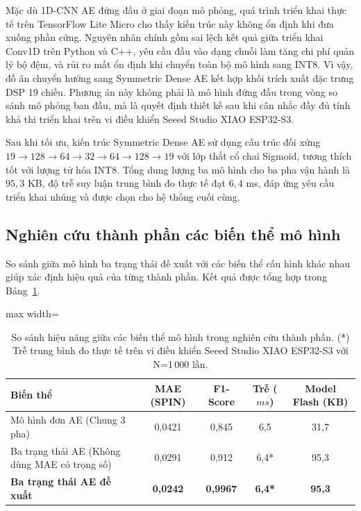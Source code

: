 Mặc dù 1D-CNN AE đứng đầu ở giai đoạn mô phỏng, quá trình triển khai thực tế trên TensorFlow Lite Micro cho thấy kiến trúc này không ổn định khi đưa xuống phần cứng. Nguyên nhân chính gồm sai lệch kết quả giữa triển khai Conv1D trên Python và C++, yêu cầu đầu vào dạng chuỗi làm tăng chi phí quản lý bộ đệm, và rủi ro mất ổn định khi chuyển toàn bộ mô hình sang INT8. Vì vậy, đồ án chuyển hướng sang Symmetric Dense AE kết hợp khối trích xuất đặc trưng DSP 19 chiều. Phương án này không phải là mô hình đứng đầu trong vòng so sánh mô phỏng ban đầu, mà là quyết định thiết kế sau khi cân nhắc đầy đủ tính khả thi triển khai trên vi điều khiển Seeed Studio XIAO ESP32-S3.

Sau khi tối ưu, kiến trúc Symmetric Dense AE sử dụng cấu trúc đối xứng $19 \rightarrow 128 \rightarrow 64 \rightarrow 32 \rightarrow 64 \rightarrow 128 \rightarrow 19$ với lớp thắt cổ chai Sigmoid, tương thích tốt với lượng tử hóa INT8. Tổng dung lượng ba mô hình cho ba pha vận hành là $95{,}3$ KB, độ trễ suy luận trung bình đo thực tế đạt $6{,}4$ ms, đáp ứng yêu cầu triển khai nhúng và được chọn cho hệ thống cuối cùng.

\subsection{Nghiên cứu thành phần các biến thể mô hình}
So sánh giữa mô hình ba trạng thái đề xuất với các biến thể cấu hình khác nhau giúp xác định hiệu quả của từng thành phần. Kết quả được tổng hợp trong Bảng~\ref{tab:ablation_study}.

\begin{table}[H]
\centering
\caption[So sánh hiệu năng các biến thể mô hình]{So sánh hiệu năng giữa các biến thể mô hình trong nghiên cứu thành phần. (*) Trễ trung bình đo thực tế trên vi điều khiển Seeed Studio XIAO ESP32-S3 với N=1\,000 lần.}
\label{tab:ablation_study}
\begin{adjustbox}{max width=\textwidth}
\begin{tabular}{|l|c|c|c|c|}
\hline
\textbf{Biến thể} & \textbf{MAE (SPIN)} & \textbf{F1-Score} & \textbf{Trễ ($ms$)} & \textbf{Model Flash (KB)} \\ \hline
Mô hình đơn AE (Chung 3 pha) & 0,0421 & 0,845 & 6,5 & 31,7 \\ \hline
Ba trạng thái AE (Không dùng MAE có trọng số) & 0,0291 & 0,912 & 6,4* & 95,3 \\ \hline
\textbf{Ba trạng thái AE đề xuất} & \textbf{0,0242} & \textbf{0,9967} & \textbf{6,4*} & \textbf{95,3} \\ \hline
\end{tabular}
\end{adjustbox}
\end{table}

